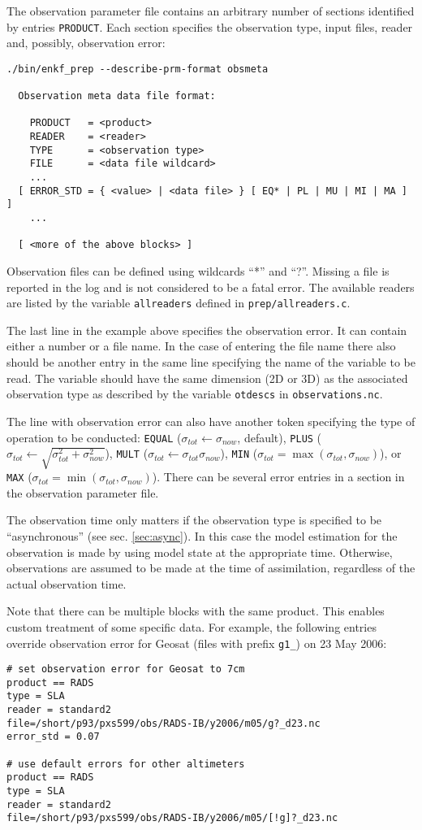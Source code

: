 \documentclass[11pt]{report}
\begin{document}
The observation parameter file contains an arbitrary number of sections identified by entries \verb|PRODUCT|.
Each section specifies the observation type, input files, reader and, possibly, observation error:
\begin{Verbatim}[frame=single,fontsize=\footnotesize]
./bin/enkf_prep --describe-prm-format obsmeta

  Observation meta data file format:

    PRODUCT   = <product>
    READER    = <reader>
    TYPE      = <observation type>
    FILE      = <data file wildcard> 
    ...
  [ ERROR_STD = { <value> | <data file> } [ EQ* | PL | MU | MI | MA ] ]
    ...

  [ <more of the above blocks> ]
\end{Verbatim}
Observation files can be defined using wildcards ``*'' and ``?''.
Missing a file is reported in the log and is not considered to be a fatal error.
The available readers are listed by the variable \verb|allreaders| defined in \verb|prep/allreaders.c|.

The last line in the example above specifies the observation error.
It can contain either a number or a file name.
In the case of entering the file name there also should be another entry in the same line specifying the name of the variable to be read.
The variable should have the same dimension (2D or 3D) as the associated observation type as described by the variable \verb|otdescs| in \verb|observations.nc|.

The line with observation error can also have another token specifying the type of operation to be conducted: \verb|EQUAL| ($\sigma_{tot} \leftarrow \sigma_{now}$, default), \verb|PLUS| ($\sigma_{tot} \leftarrow \sqrt{\sigma_{tot}^2 + \sigma_{now}^2}$), \verb|MULT| ($\sigma_{tot} \leftarrow \sigma_{tot} \sigma_{now}$), \verb|MIN| ($\sigma_{tot} = \max(\sigma_{tot}, \sigma_{now})$), or \verb|MAX| ($\sigma_{tot} = \min(\sigma_{tot}, \sigma_{now})$).
There can be several error entries in a section in the observation parameter file.

The observation time only matters if the observation type is specified to be ``asynchronous'' (see sec. \ref{sec:async}).
In this case the model estimation for the observation is made by using model state at the appropriate time.
Otherwise, observations are assumed to be made at the time of assimilation, regardless of the actual observation time.

Note that there can be multiple blocks with the same product.
This enables custom treatment of some specific data.
For example, the following entries override observation error for Geosat (files with prefix \verb|g1_|) on 23 May 2006:
\begin{Verbatim}[frame=single,fontsize=\footnotesize]
# set observation error for Geosat to 7cm
product == RADS
type = SLA
reader = standard2
file=/short/p93/pxs599/obs/RADS-IB/y2006/m05/g?_d23.nc
error_std = 0.07

# use default errors for other altimeters
product == RADS
type = SLA
reader = standard2
file=/short/p93/pxs599/obs/RADS-IB/y2006/m05/[!g]?_d23.nc
\end{Verbatim}
\end{document}
